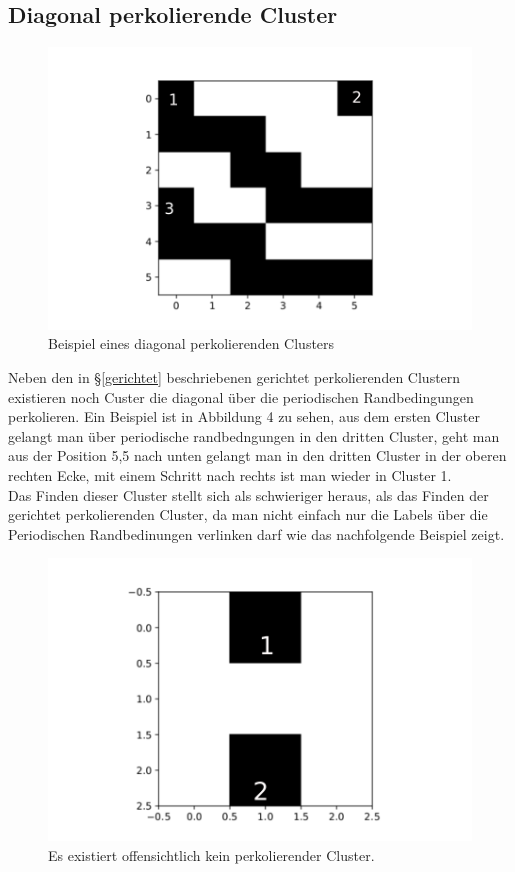 \documentclass[a4paper, 12pt]{report}
\begin{document}
\subsection{Diagonal perkolierende Cluster}
\begin{figure}[h!]
	\centering
	\includegraphics[scale=0.6]{diagonalperc1.pdf}
	\caption{Beispiel eines diagonal perkolierenden Clusters}
\end{figure}
\vspace{0,5cm}
\noindent Neben den in §\ref{gerichtet} beschriebenen gerichtet perkolierenden Clustern existieren noch Custer die diagonal über die periodischen Randbedingungen perkolieren. Ein Beispiel ist in Abbildung 4 zu sehen, aus dem ersten Cluster gelangt man über periodische randbedngungen in den dritten Cluster, geht man aus der Position 5,5 nach unten gelangt man in den dritten Cluster in der oberen rechten Ecke, mit einem Schritt nach rechts ist man wieder in Cluster 1.
\\
\noindent Das Finden dieser Cluster stellt sich als schwieriger heraus, als das Finden der gerichtet perkolierenden Cluster, da man nicht einfach nur die Labels über die Periodischen Randbedinungen verlinken darf wie das nachfolgende Beispiel zeigt.
\begin{figure}[h!]
	\centering
	\includegraphics[scale=0.6]{noperc1.pdf}
	\caption{Es existiert offensichtlich kein perkolierender Cluster.}
\end{figure}
\end{document}
